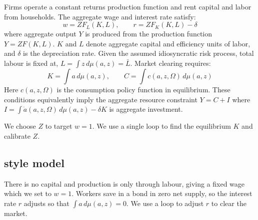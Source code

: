 \documentclass[11pt,english]{article}
\begin{document}
Firms operate a constant returns production function and rent capital and labor from households. The aggregate wage and interest rate satisfy:
\begin{equation}
\label{eq:prices}
w = Z F_L(K, L), \qquad r = Z F_K(K, L) - \delta
\end{equation}
where aggregate output $Y$ is produced from the production function \( Y = Z F(K, L) \). \( K \) and \( L \) denote aggregate capital and efficiency units of labor, and \( \delta \) is the depreciation rate. Given the assumed idiosyncratic risk process, total labour is fixed at, \( L = \int z \, d\mu(a,z) = \bar L\). Market clearing requires:
\begin{equation}
K = \int a \, d\mu(a,z), \qquad C = \int c(a,z,\Omega) \, d\mu(a,z)
\end{equation}
Here $c(a,z,\Omega)$ is the consumption policy function in equilibrium. These conditions equivalently imply the aggregate resource constraint $Y = C + I$ where $I = \int \dot a(a,z,\Omega) \, d\mu(a,z) - \delta K$ is aggregate investment. 

We choose $Z$ to target $w=1$. We use a single loop to find the equilibrium $K$ and calibrate $Z$. 

\subsection{\cite{HuggettRiskfree1993} style model}

There is no capital and production is only through labour, giving a fixed wage which we set to $w=1$. Workers save in a bond in zero net supply, so the interest rate $r$ adjusts so that $\int a \, d\mu(a,z) = 0$. We use a loop to adjust $r$ to clear the market. 



%




 
%
%
%
%
%
%
%
%
%
%
\end{document}
